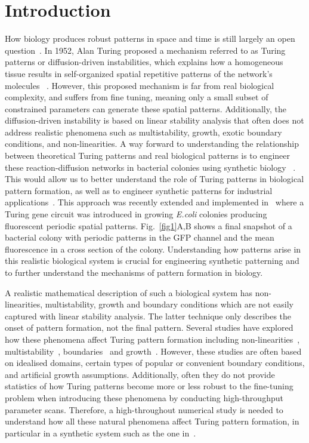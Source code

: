\section{Introduction}

How biology produces robust patterns in space and time is still largely an open question~\parencite{scholes2017three}.
In 1952, Alan Turing proposed a mechanism referred to as Turing patterns or diffusion-driven instabilities, which explains how a homogeneous tissue results in self-organized spatial repetitive patterns of the network’s molecules ~\parencite{Turing1952, Gierer1972}.
However, this proposed mechanism is far from real biological complexity, and suffers from fine tuning, meaning only a small subset of constrained parameters can generate these spatial patterns.
Additionally, the diffusion-driven instability is based on linear stability analysis that often does not address realistic phenomena such as multistability, growth, exotic boundary conditions, and non-linearities.
A way forward to understanding the relationship between theoretical Turing patterns and real biological patterns is to engineer these reaction-diffusion networks in bacterial colonies using synthetic biology ~\parencite{Sekine2018, Karig2018}.
This would allow us to better understand the role of Turing patterns in biological pattern formation, as well as to engineer synthetic patterns for industrial applications~\parencite{cao2017programmable, tan2018polyamide,din2020interfacing}.
This approach was recently extended and implemented in~\cite{Oliver2023} where a Turing gene circuit was introduced in growing \textit{E.coli} colonies producing fluorescent periodic spatial patterns. Fig.~\ref{fig1}A,B shows a final snapshot of a bacterial colony with periodic patterns in the GFP channel and the mean fluorescence in a cross section of the colony.
Understanding how patterns arise in this realistic biological system is crucial for engineering synthetic patterning and to further understand the mechanisms of pattern formation in biology.

A realistic mathematical description of such a biological system has non-linearities, multistability, growth and boundary conditions which are not easily captured with linear stability analysis. The latter technique only describes the onset of pattern formation, not the final pattern.
Several studies have explored how these phenomena affect Turing pattern formation including non-linearities~\parencite{ermentrout1991stripes}, multistability~\parencite{Krause2023}, boundaries~\parencite{Arcuri1986,Maini1993, Maini1997,Krause2020, Krause2021, Woolley2022} and growth~\parencite{gaffney2010, Klika2017, Krause2019}.
However, these studies are often based on idealised domains, certain types of popular or convenient boundary conditions, and artificial growth assumptions.
Additionally, often they do not provide statistics of how Turing patterns become more or less robust to the fine-tuning problem when introducing these phenomena by conducting high-throughput parameter scans.
Therefore, a high-throughout numerical study is needed to understand how all these natural phenomena affect Turing pattern formation, in particular in a synthetic system such as the one in~\cite{Oliver2023}.

